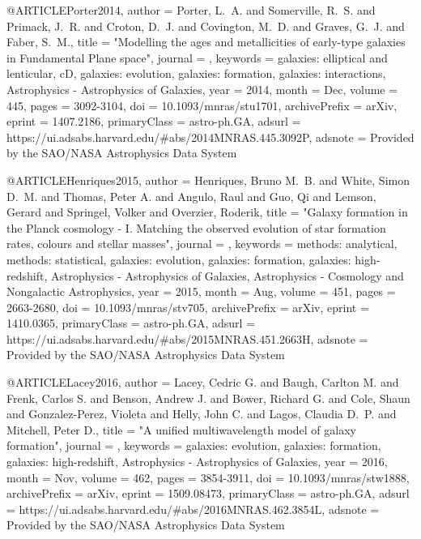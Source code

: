 @ARTICLE{Porter2014,
       author = {{Porter}, L.~A. and {Somerville}, R.~S. and {Primack}, J.~R. and
        {Croton}, D.~J. and {Covington}, M.~D. and {Graves}, G.~J. and
        {Faber}, S.~M.},
        title = "{Modelling the ages and metallicities of early-type galaxies in Fundamental Plane space}",
      journal = {\mnras},
     keywords = {galaxies: elliptical and lenticular, cD, galaxies: evolution, galaxies: formation, galaxies: interactions, Astrophysics - Astrophysics of Galaxies},
         year = 2014,
        month = Dec,
       volume = {445},
        pages = {3092-3104},
          doi = {10.1093/mnras/stu1701},
archivePrefix = {arXiv},
       eprint = {1407.2186},
 primaryClass = {astro-ph.GA},
       adsurl = {https://ui.adsabs.harvard.edu/\#abs/2014MNRAS.445.3092P},
      adsnote = {Provided by the SAO/NASA Astrophysics Data System}
}

@ARTICLE{Henriques2015,
       author = {{Henriques}, Bruno M.~B. and {White}, Simon D.~M. and {Thomas}, Peter A.
        and {Angulo}, Raul and {Guo}, Qi and {Lemson}, Gerard and
        {Springel}, Volker and {Overzier}, Roderik},
        title = "{Galaxy formation in the Planck cosmology - I. Matching the observed evolution of star formation rates, colours and stellar masses}",
      journal = {\mnras},
     keywords = {methods: analytical, methods: statistical, galaxies: evolution, galaxies: formation, galaxies: high-redshift, Astrophysics - Astrophysics of Galaxies, Astrophysics - Cosmology and Nongalactic Astrophysics},
         year = 2015,
        month = Aug,
       volume = {451},
        pages = {2663-2680},
          doi = {10.1093/mnras/stv705},
archivePrefix = {arXiv},
       eprint = {1410.0365},
 primaryClass = {astro-ph.GA},
       adsurl = {https://ui.adsabs.harvard.edu/\#abs/2015MNRAS.451.2663H},
      adsnote = {Provided by the SAO/NASA Astrophysics Data System}
}

@ARTICLE{Lacey2016,
       author = {{Lacey}, Cedric G. and {Baugh}, Carlton M. and {Frenk}, Carlos S. and
        {Benson}, Andrew J. and {Bower}, Richard G. and {Cole}, Shaun
        and {Gonzalez-Perez}, Violeta and {Helly}, John C. and {Lagos},
        Claudia D.~P. and {Mitchell}, Peter D.},
        title = "{A unified multiwavelength model of galaxy formation}",
      journal = {\mnras},
     keywords = {galaxies: evolution, galaxies: formation, galaxies: high-redshift, Astrophysics - Astrophysics of Galaxies},
         year = 2016,
        month = Nov,
       volume = {462},
        pages = {3854-3911},
          doi = {10.1093/mnras/stw1888},
archivePrefix = {arXiv},
       eprint = {1509.08473},
 primaryClass = {astro-ph.GA},
       adsurl = {https://ui.adsabs.harvard.edu/\#abs/2016MNRAS.462.3854L},
      adsnote = {Provided by the SAO/NASA Astrophysics Data System}
}


